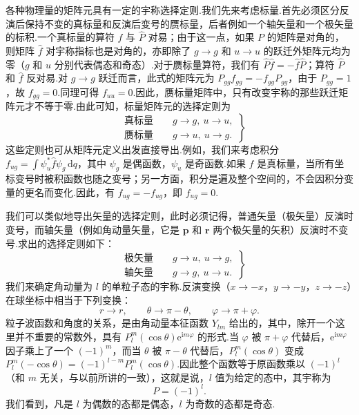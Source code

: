 各种物理量的矩阵元具有一定的宇称选择定则.我们先来考虑标量.首先必须区分反演后保持不变的真标量和反演后变号的赝标量，后者例如一个轴矢量和一个极矢量的标积.一个真标量的算符 $\hat{f}$ 与 $\hat{P}$ 对易；由于这一点，如果 $P$ 的矩阵是对角的，则矩阵 $\hat{f}$ 对宇称指标也是对角的，亦即除了 $g\longrightarrow g$ 和 $u\longrightarrow u$ 的跃迁外矩阵元均为零（$g$ 和 $u$ 分别代表偶态和奇态）.对于赝标量算符，我们有 $\hat{P}\hat{f}=-\hat{f}\hat{P}$；算符 $\hat{P}$ 和 $\hat{f}$ 反对易.对 $g\longrightarrow g$ 跃迁而言，此式的矩阵元为 $P_{gg}f_{gg}=-f_{gg}P_{gg}$，由于 $P_{gg}=1$，故 $f_{gg}=0$.同理可得 $f_{uu}=0$.因此，赝标量矩阵中，只有改变宇称的那些跃迁矩阵元才不等于零.由此可知，标量矩阵元的选择定则为
\begin{equation}
\left.\begin{aligned}
  &\text{真标量}\qquad g\longrightarrow g,\ u\longrightarrow u,\\
  &\text{赝标量}\qquad g\longrightarrow u,\ u\longrightarrow g.
\end{aligned}\right\}
\end{equation}
这些定则也可从矩阵元定义出发直接导出.例如，我们来考虑积分 $f_{ug}=\int\psi_u^{*}\hat{f}\psi_g\,\mathrm{d}q$，其中 $\psi_g$ 是偶函数，$\psi_u$ 是奇函数.如果 $f$ 是真标量，当所有坐标变号时被积函数也随之变号；另一方面，积分是遍及整个空间的，不会因积分变量的更名而变化.因此，有 $f_{ug}=-f_{ug}$，即 $f_{ug}=0$.

我们可以类似地导出矢量的选择定则，此时必须记得，普通矢量（极矢量）反演时变号，而轴矢量（例如角动量矢量，它是 $\boldsymbol{p}$ 和 $\boldsymbol{r}$ 两个极矢量的矢积）反演时不变号.求出的选择定则如下：
\begin{equation}
\left.\begin{aligned}
  &\text{极矢量}\qquad g\longrightarrow u,\ u\longrightarrow g,\\
  &\text{轴矢量}\qquad g\longrightarrow g,\ u\longrightarrow u.
\end{aligned}\right\}
\end{equation}
我们来确定角动量为 $l$ 的单粒子态的宇称.反演变换（$x\longrightarrow-x$，$y\longrightarrow-y$，$z\longrightarrow-z$）在球坐标中相当于下列变换：
\begin{equation}
  r\longrightarrow r,\qquad
  \theta\longrightarrow\pi-\theta,\qquad
  \varphi\longrightarrow\pi+\varphi.
\end{equation}
粒子波函数和角度的关系，是由角动量本征函数 $Y_{lm}$ 给出的，其中，除开一个这里并不重要的常数外，具有 $P_l^m(\cos\theta)\mathrm{e}^{\mathrm{i}m\varphi}$ 的形式.当 $\varphi$ 被 $\pi+\varphi$ 代替后，$\mathrm{e}^{\mathrm{i}m\varphi}$ 因子乘上了一个 $(-1)^m$，而当 $\theta$ 被 $\pi-\theta$ 代替后，$P_l^m(\cos\theta)$ 变成 $P_l^m(-\cos\theta)=(-1)^{l-m}P_l^m(\cos\theta)$.因此整个函数等于原函数乘以 $(-1)^l$（和 $m$ 无关，与以前所讲的一致），这就是说，$l$ 值为给定的态中，其宇称为
\begin{equation}
  P=(-1)^l.
\end{equation}
我们看到，凡是 $l$ 为偶数的态都是偶态，$l$ 为奇数的态都是奇态.

